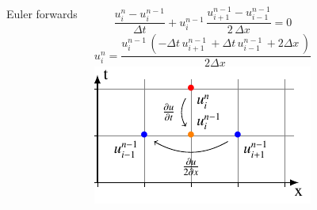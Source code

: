 




\begin{frame}
  \begin{columns}
    Euler forwards

  $$\frac{u_{i}^{n}-u_{i}^{n-1}}{\Delta t}+ u_{i}^{n-1}\, \frac{u_{i+1}^{n-1}-u_{i-1}^{n-1}}{2\,\Delta x}=0$$
  $$ u_{i}^{n} = \frac{u^{n-1}_{i}\, \left(- \Delta{t}\, u^{n-1}_{i+1}\, + \Delta{t}\, u^{n-1}_{i-1}\, + 2 \Delta{x}\,\right)}{2 \Delta{x}\,}$$
    \includegraphics[width=\linewidth]{../BurgersEquation/tikz/linear3/linear3.pdf}\\
  \end{columns}
\end{frame}

